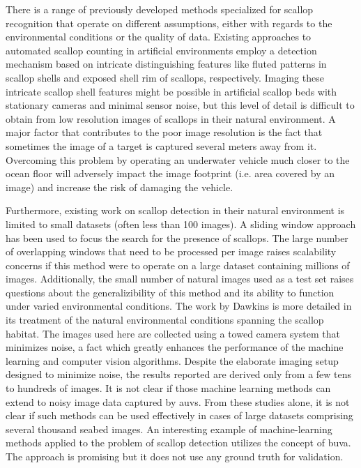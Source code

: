 \documentclass {udthesis}
\begin{document}
There is a range of previously developed methods specialized for scallop recognition 
\cite{dawkings13,guomundsson,enomoto9,enomoto10,fearn, prasanna_med, prasanna_aslo, prasanna_igi} 
that operate on different assumptions, either with regards to the environmental conditions or the quality of data.
Existing approaches to automated scallop counting in artificial environments
 \cite{enomoto9, enomoto10} employ a detection mechanism based on intricate distinguishing features 
like fluted patterns in scallop shells and exposed shell rim of scallops, respectively.
Imaging these intricate scallop shell features might
be possible in artificial scallop beds with stationary cameras and 
minimal sensor noise, but this level of detail 
is difficult to obtain from low resolution images of scallops in their natural environment. 
A major factor that contributes to the poor image resolution is the fact that sometimes the image of a target
is captured several meters away from it. 
Overcoming this problem by operating an underwater vehicle much closer to the ocean floor 
will adversely impact the image footprint (i.e. area covered by an image) and increase the risk of damaging the vehicle.

Furthermore, existing work on scallop detection \cite{dawkings13, guomundsson} in their natural
environment is limited to small datasets (often less than 100 images). 
A sliding window approach has been used \cite{guomundsson} to focus the search for the presence of scallops. The large number of overlapping windows that need to be processed per image raises scalability concerns if this method were to operate 
on a large dataset containing millions of images. Additionally, the small number of natural images used as a test set raises questions about the generalizibility of this method and its ability to function under varied environmental conditions.
The work by Dawkins \cite{dawkings13} is more detailed in its treatment of the natural environmental conditions spanning the scallop habitat. The images used here are collected using a towed camera system that minimizes noise, a fact which greatly enhances the performance of the machine learning and computer vision algorithms. Despite the elaborate imaging setup designed to minimize noise, the results reported are derived only from a few tens to hundreds of images.
It is not clear if those machine learning methods \cite{dawkings13} can extend to noisy image data captured by \gls{auv}s.
From these studies alone, it is not clear if such methods can be used effectively
in cases of large datasets comprising several thousand seabed images.
An interesting example of machine-learning methods applied to the
problem of scallop detection \cite{fearn} 
utilizes the concept of \gls{buva}.
The approach is promising but it does not use any ground truth for validation.  
\end{document}
